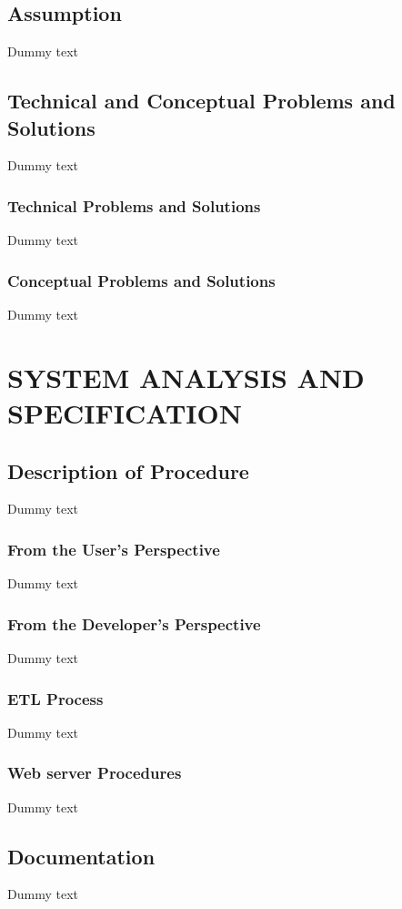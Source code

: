 \documentclass{article}
\begin{document}
\subsection{Assumption}
Dummy text

\subsection{Technical and Conceptual Problems and Solutions}
Dummy text
\subsubsection{Technical Problems and Solutions}
Dummy text

\subsubsection{Conceptual Problems and Solutions}
Dummy text



\section{SYSTEM ANALYSIS AND SPECIFICATION}
\subsection{Description of Procedure}
Dummy text

\subsubsection{From the User's Perspective}
Dummy text

\subsubsection{From the Developer's Perspective}
Dummy text

\subsubsection{ETL Process}
Dummy text

\subsubsection{Web server Procedures}
Dummy text


\subsection{Documentation}
Dummy text
\end{document}
